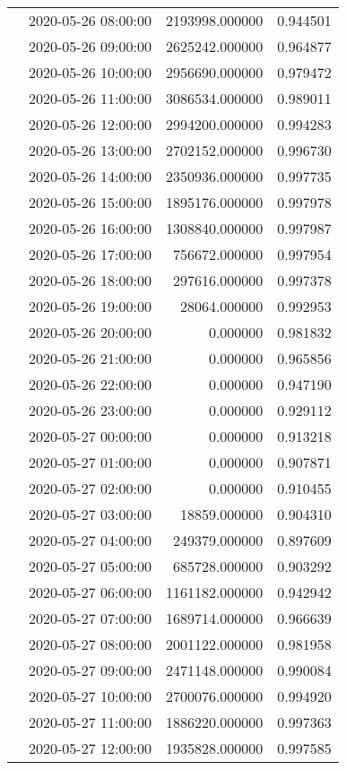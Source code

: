 \begin{tabular}{llrr}
 & 2020-05-26 08:00:00 & 2193998.000000 & 0.944501 \\
 & 2020-05-26 09:00:00 & 2625242.000000 & 0.964877 \\
 & 2020-05-26 10:00:00 & 2956690.000000 & 0.979472 \\
 & 2020-05-26 11:00:00 & 3086534.000000 & 0.989011 \\
 & 2020-05-26 12:00:00 & 2994200.000000 & 0.994283 \\
 & 2020-05-26 13:00:00 & 2702152.000000 & 0.996730 \\
 & 2020-05-26 14:00:00 & 2350936.000000 & 0.997735 \\
 & 2020-05-26 15:00:00 & 1895176.000000 & 0.997978 \\
 & 2020-05-26 16:00:00 & 1308840.000000 & 0.997987 \\
 & 2020-05-26 17:00:00 & 756672.000000 & 0.997954 \\
 & 2020-05-26 18:00:00 & 297616.000000 & 0.997378 \\
 & 2020-05-26 19:00:00 & 28064.000000 & 0.992953 \\
 & 2020-05-26 20:00:00 & 0.000000 & 0.981832 \\
 & 2020-05-26 21:00:00 & 0.000000 & 0.965856 \\
 & 2020-05-26 22:00:00 & 0.000000 & 0.947190 \\
 & 2020-05-26 23:00:00 & 0.000000 & 0.929112 \\
 & 2020-05-27 00:00:00 & 0.000000 & 0.913218 \\
 & 2020-05-27 01:00:00 & 0.000000 & 0.907871 \\
 & 2020-05-27 02:00:00 & 0.000000 & 0.910455 \\
 & 2020-05-27 03:00:00 & 18859.000000 & 0.904310 \\
 & 2020-05-27 04:00:00 & 249379.000000 & 0.897609 \\
 & 2020-05-27 05:00:00 & 685728.000000 & 0.903292 \\
 & 2020-05-27 06:00:00 & 1161182.000000 & 0.942942 \\
 & 2020-05-27 07:00:00 & 1689714.000000 & 0.966639 \\
 & 2020-05-27 08:00:00 & 2001122.000000 & 0.981958 \\
 & 2020-05-27 09:00:00 & 2471148.000000 & 0.990084 \\
 & 2020-05-27 10:00:00 & 2700076.000000 & 0.994920 \\
 & 2020-05-27 11:00:00 & 1886220.000000 & 0.997363 \\
 & 2020-05-27 12:00:00 & 1935828.000000 & 0.997585 \\

\end{tabular}
